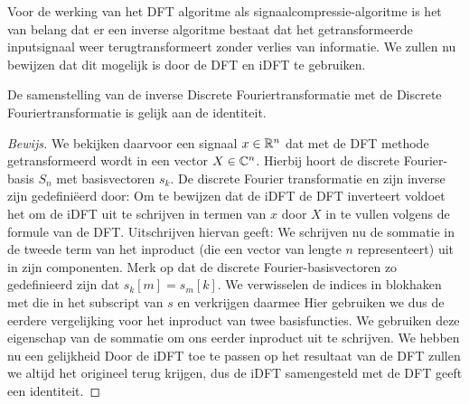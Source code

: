Voor de werking van het DFT algoritme als signaalcompressie-algoritme is het van belang dat er een
inverse algoritme bestaat dat het getransformeerde inputsignaal weer terugtransformeert
zonder verlies van informatie. We zullen nu bewijzen dat dit mogelijk is door de DFT en iDFT te gebruiken.

\begin{stelling}
  De samenstelling van de inverse Discrete Fouriertransformatie met de Discrete Fouriertransformatie is
  gelijk aan de identiteit.
\end{stelling}
\begin{proof}[Bewijs]
  We bekijken daarvoor een signaal $x\in\mathbb{R}^n$ dat met de DFT methode getransformeerd wordt in een vector $X\in\mathbb{C}^n$.
  Hierbij hoort de discrete Fourier-basis $S_n$ met basisvectoren $s_k$.
  De discrete Fourier transformatie en zijn inverse zijn gedefini\"eerd door:
  Om te bewijzen dat de iDFT de DFT inverteert voldoet het om de iDFT uit te schrijven in termen van $x$
  door $X$ in te vullen volgens de formule van de DFT. Uitschrijven hiervan geeft:
  We schrijven nu de sommatie in de tweede term van het inproduct (die een vector van lengte $n$ representeert) uit in zijn componenten.
  Merk op dat de discrete Fourier-basisvectoren zo gedefinieerd zijn dat $s_k[m] = s_m[k]$.
  We verwisselen de indices in blokhaken met die in het subscript van $s$ en verkrijgen daarmee
  Hier gebruiken we dus de eerdere vergelijking voor het inproduct van twee basisfuncties.
  We gebruiken deze eigenschap van de sommatie om ons eerder inproduct uit te schrijven.
  We hebben nu een gelijkheid
  Door de iDFT toe te passen op het resultaat van de DFT zullen we altijd het origineel terug krijgen,
  dus de iDFT samengesteld met de DFT geeft een identiteit.
\end{proof}

